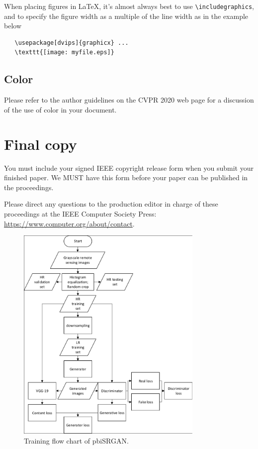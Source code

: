 \documentclass[10pt,twocolumn,letterpaper]{article}
\begin{document}
When placing figures in \LaTeX, it's almost always best to use
\verb+\includegraphics+, and to specify the  figure width as a multiple of
the line width as in the example below
{\small\begin{verbatim}
   \usepackage[dvips]{graphicx} ...
   \texttt{[image: myfile.eps]}
\end{verbatim}
}


\subsection{Color}

Please refer to the author guidelines on the CVPR 2020 web page for a discussion
of the use of color in your document.

\section{Final copy}

You must include your signed IEEE copyright release form when you submit
your finished paper. We MUST have this form before your paper can be
published in the proceedings.

Please direct any questions to the production editor in charge of these 
proceedings at the IEEE Computer Society Press: 
\url{https://www.computer.org/about/contact}. 


\begin{figure}
\begin{center}
\includegraphics[width=0.8\textwidth]{fig1}
\end{center}
   \caption{Training flow chart of pbiSRGAN.}
\label{fig1}
\end{figure}
\end{document}
